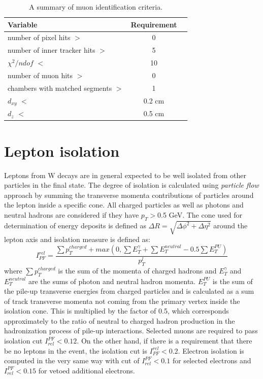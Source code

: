   \begin{table}[h]
\centering
  \caption{A summary of muon identification criteria.}
  \label{tab:muID}
  \begin{tabular}{ l  c c}
      \hline
      \hline
      	Variable & Requirement \\
      	\hline
    		number of pixel hits $>$ &  0 \\
     	number of inner tracker hits $>$ &  5 \\
     	$\chi^2/ndof$ $<$ & 10 \\
		number of muon hits $>$ & 0  \\
		chambers with matched segments $>$ & 1  \\		
		$d_{xy}$ $<$ & 0.2 cm \\
		$d_{z}$ $<$  & 0.5 cm \\
      \hline
      \hline 
  \end{tabular}
\end{table}
 


\section{Lepton isolation}
Leptons from W decays are in general expected to be well isolated from other particles in the final state. The degree of isolation is calculated using \textit{particle flow} approach by summing the transverse momenta contributions of particles around the lepton inside a specific cone. All charged particles as well as photons and neutral hadrons are considered if they have $p_T>$0.5 GeV. The cone used for determination of energy deposits is defined as $\Delta R = \sqrt{\Delta \phi^2+ \Delta \eta^2}$ around the lepton axis and isolation measure is defined as:
\begin{equation}
I_{PF}^{rel} = \frac{\sum p_T^{charged} + max(0, \sum E_T^{\gamma}+\sum E_T^{neutral}-0.5\sum E_T^{PU})}{p_T^l}
\end{equation}
where $\sum p_T^{charged}$ is the sum of the momenta of charged hadrons and $E_T^{\gamma} $ and $E_T^{neutral}$ are the sums of photon and neutral hadron momenta. $E_T^{PU}$ is the sum of the pile-up transverse energies from charged particles and is calculated as a sum of track transverse momenta not coming from the primary vertex inside the isolation cone. This is multiplied by the factor of 0.5, which corresponds approximately to the ratio of neutral to charged hadron production in the hadronization process of pile-up interactions. Selected muons are required to pass isolation cut $I_{rel}^{PF}<0.12$. On the other hand, if there is a requirement that there be no leptons in the event, the isolation cut is $I_{PF}^{rel}<0.2$. Electron isolation is computed in the very same way with cut of $I_{rel}^{PF}<0.1$ for selected electrons and $I_{rel}^{PF}<0.15$ for vetoed additional electrons.


